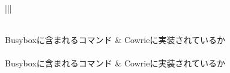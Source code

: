 \begin{longtable}{|||}
  \caption{実装コマンド一覧}
  \label{table:command} \\
  \hline
  Busyboxに含まれるコマンド & Cowrieに実装されているか \\ \hline\hline
  \endfirsthead
   \\ \hline
  Busyboxに含まれるコマンド & Cowrieに実装されているか \\ \hline\hline
  \endhead
  \hline
   \\
  \endfoot
  \hline
   \\
  \endlastfoot


\end{longtable}
